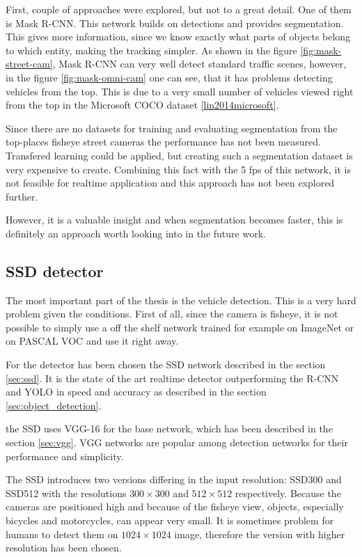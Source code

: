 \documentclass[a4paper,12pt,titlepage, twoside]{article}
\numberwithin{figure}{section}
\begin{document}
First, couple of approaches were explored, but not to a great detail. One of them is Mask R-CNN\cite{he2017mask}. This network builds on detections and provides segmentation. This gives more information, since we know exactly what parts of objects belong to which entity, making the tracking simpler. As shown in the figure \ref{fig:mask-street-cam}, Mask R-CNN can very well detect standard traffic scenes, however, in the figure \ref{fig:mask-omni-cam}  one can see, that it has problems detecting vehicles from the top. This is due to a very small number of vehicles viewed right from the top in the Microsoft COCO dataset \ref{lin2014microsoft}. 

Since there are no datasets for training and evaluating segmentation from the top-places fisheye street cameras the performance has not been measured. Transfered learning could be applied, but creating such a segmentation dataset is very expensive to create. Combining this fact with the 5 fps of this network, it is not feasible for realtime application and this approach has not been explored further. 

However, it is a valuable insight and when segmentation becomes faster, this is definitely an approach worth looking into in the future work.

\subsection{SSD detector}
\label{sec:ssd-implementation}
The most important part of the thesis is the vehicle detection. This is a very hard problem given the conditions. First of all, since the camera is fisheye, it is not possible to simply use a off the shelf network trained for example on ImageNet or on PASCAL VOC and use it right away. 

For the detector has been chosen the SSD network \cite{liu2016ssd} described in the section \ref{sec:ssd}. It is the state of the art realtime detector outperforming the R-CNN\cite{faster-rcnn} and YOLO\cite{redmon2016you} in speed and accuracy as described in the section \ref{sec:object_detection}. 

the SSD uses VGG-16 for the base network, which has been described in the section \ref{sec:vgg}. VGG networks are popular among detection networks for their performance and simplicity. 

The SSD introduces two versions differing in the input resolution: SSD300 and SSD512 with the resolutions $300 \times 300$ and $512 \times 512$ respectively. Because the cameras are positioned high and because of the fisheye view, objects, especially bicycles and motorcycles, can appear very small. It is sometimes problem for humans to detect them on $1024 \times 1024$ image, therefore the version with higher resolution has been chosen. 
\end{document}
